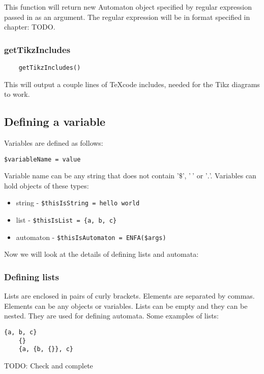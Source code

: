 \documentclass{ctuthesis}
\begin{document}
This function will return new Automaton object specified by regular expression passed in as an argument. The regular expression will be in format specified in chapter: TODO.

\subsubsection{getTikzIncludes}
\label{subsec:getTikzIncludes}
\begin{verbatim}
	getTikzIncludes()
\end{verbatim}

This will output a couple lines of \TeX code includes, needed for the Tikz diagrams to work.

\subsection{Defining a variable}
Variables are defined as follows:
\begin{verbatim}
$variableName = value
\end{verbatim}

Variable name can be any string that does not contain '$\$$', '$\ $' or '$.$'. Variables can hold objects of these types:
\begin{itemize}
	\item string - \verb'$thisIsString = hello world'
	\item list - \verb'$thisIsList = {a, b, c}'
	\item automaton - \verb'$thisIsAutomaton = ENFA($args)'
\end{itemize}

Now we will look at the details of defining lists and automata:

\subsubsection{Defining lists}
Lists are enclosed in pairs of curly brackets. Elements are separated by commas. Elements can be any objects or variables. Lists can be empty and they can be nested. They are used for defining automata. Some examples of lists:

\begin{minipage}{\linewidth}
\begin{lstlisting}[language = JASL]
	{a, b, c}
	{}
	{a, {b, {}}, c}
\end{lstlisting}
\end{minipage}
TODO: Check and complete
\end{document}
